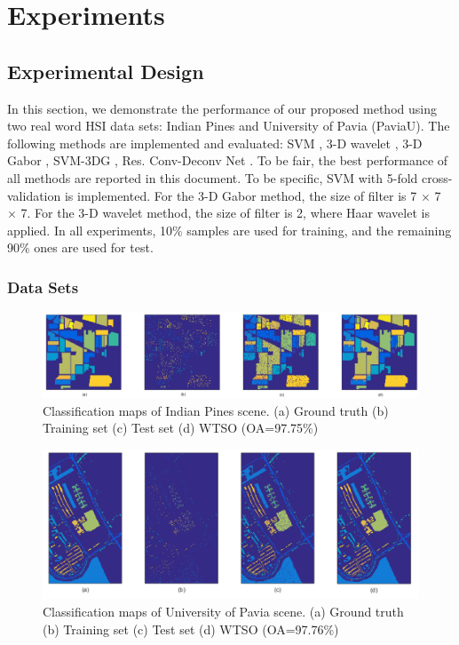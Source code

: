 \documentclass{ws-ijwmip}
\begin{document}
\section{Experiments}\label{sec:experiment}
\subsection{Experimental Design}



In this section, we demonstrate the performance of our proposed method using two real word HSI data sets: Indian Pines and University of Pavia (PaviaU). 
The following methods are implemented and evaluated:
SVM \cite{37}, 3-D wavelet \cite{29}, 3-D Gabor \cite{38}, SVM-3DG \cite{40}, Res. Conv-Deconv Net \cite{41}. 
To be fair, the best performance of all methods are reported in this document.
To be specific, SVM with 5-fold cross-validation is implemented.
For the 3-D Gabor method, the size of filter is 7 $\times$ 7 $\times$ 7.
For the 3-D wavelet method, the size of filter is 2, where Haar wavelet is applied. 
In all experiments, 10\% samples are used for training, and the remaining 90\% ones are used for test. 


\subsubsection{Data Sets}

\begin{figure}[htb]
	\centerline{\includegraphics[width=13cm]{image/indian_map}}
	\caption{Classification maps of Indian Pines scene. (a) Ground truth (b) Training set (c) Test set (d) WTSO (OA=97.75\%)}
	\label{figure7}
\end{figure}


\begin{figure}[bh]
	\centerline{\includegraphics[width=12cm]{image/paviaMap}}
	\caption{Classification maps of University of Pavia scene. (a) Ground truth (b) Training set (c) Test set (d) WTSO (OA=97.76\%)}
	\label{figure8}
\end{figure}
\end{document}
